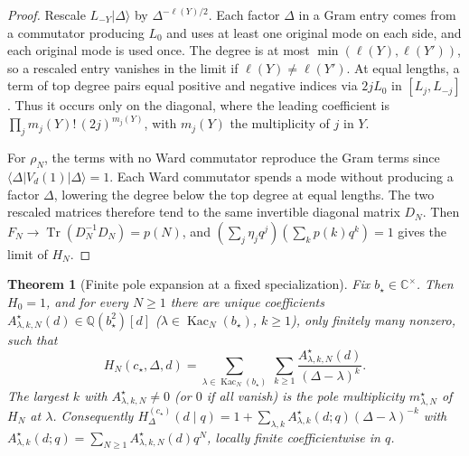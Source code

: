 \documentclass[twoside,10pt]{article}
\numberwithin{equation}{section}
\theoremstyle{slbody}
\newtheorem{theorem}{Theorem}[section]
\theoremstyle{definition}
\theoremstyle{remark}
\newcommand{\Tr}{\operatorname{Tr}}
\begin{document}
\begin{proof}
Rescale \(L_{-Y}|\Delta\rangle\) by \(\Delta^{-\ell(Y)/2}\). Each factor \(\Delta\) in a Gram entry comes from a
commutator producing \(L_0\) and uses at least one original mode on each
side, and each original mode is used once. The degree is at most \(\min(\ell(Y),\ell(Y'))\), so a rescaled entry
vanishes in the limit if \(\ell(Y)\ne\ell(Y')\). At equal lengths, a term of top
degree pairs equal positive and negative indices via \(2jL_0\) in
\([L_j,L_{-j}]\). Thus it occurs only on the diagonal, where the leading
coefficient is \(\prod_j m_j(Y)!\,(2j)^{m_j(Y)}\), with \(m_j(Y)\) the
multiplicity of \(j\) in \(Y\).

For \(\rho_N\), the terms with no Ward commutator reproduce the Gram
terms since \(\langle\Delta|V_d(1)|\Delta\rangle=1\). Each Ward
commutator spends a mode without producing a factor \(\Delta\), lowering
the degree below the top degree at equal lengths. The two rescaled matrices
therefore tend to the same invertible diagonal matrix \(D_N\).
Then \(F_N\to\Tr(D_N^{-1}D_N)=p(N)\), and
\((\sum_j\eta_jq^j)(\sum_kp(k)q^k)=1\) gives the limit of \(H_N\).
\end{proof}

\begin{theorem}[Finite pole expansion at a fixed specialization]
\label{thm:general-partial-fractions}
Fix \(b_\star\in\mathbb C^\times\).  Then \(H_0=1\),
and for every \(N\geq1\) there are unique coefficients
\(A^{\star}_{\lambda,k,N}(d)\in\mathbb Q(b_\star^2)[d]\)
(\(\lambda\in\operatorname{Kac}_N(b_\star)\), \(k\geq1\)), only finitely many nonzero,
such that
\[
 H_N(c_\star,\Delta,d)
 =\sum_{\lambda\in\operatorname{Kac}_N(b_\star)}\ \sum_{k\geq1}
 \frac{A^{\star}_{\lambda,k,N}(d)}{(\Delta-\lambda)^k}.
\]
The largest \(k\) with \(A^{\star}_{\lambda,k,N}\neq0\) (or \(0\) if all
vanish) is the pole multiplicity \(m^\star_{\lambda,N}\) of \(H_N\) at \(\lambda\).
Consequently
\(H_\Delta^{(c_\star)}(d\mid q)=1+\sum_{\lambda,k}A^{\star}_{\lambda,k}(d;q)
(\Delta-\lambda)^{-k}\) with
\(A^{\star}_{\lambda,k}(d;q)=\sum_{N\geq1}A^{\star}_{\lambda,k,N}(d)q^N\),
locally finite coefficientwise in \(q\).
\end{theorem}
\end{document}
